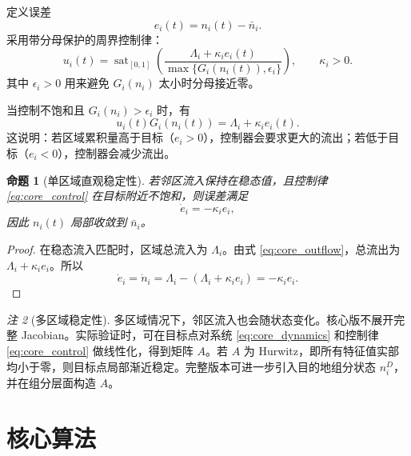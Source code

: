 \documentclass[a4paper,12pt]{article}
\theoremstyle{plain}
\newtheorem{proposition}{命题}[section]
\theoremstyle{definition}
\theoremstyle{remark}
\newtheorem{remark}[proposition]{注}
\begin{document}
定义误差
\begin{equation}\label{eq:core_error}
    e_i(t)=n_i(t)-\bar n_i .
\end{equation}
采用带分母保护的周界控制律：
\begin{equation}\label{eq:core_control}
    u_i(t)
    =
    \operatorname{sat}_{[0,1]}
    \left(
    \frac{\Lambda_i+\kappa_i e_i(t)}
    {\max\{G_i(n_i(t)),\epsilon_i\}}
    \right),
    \qquad
    \kappa_i>0 .
\end{equation}
其中 $\epsilon_i>0$ 用来避免 $G_i(n_i)$ 太小时分母接近零。

当控制不饱和且 $G_i(n_i)>\epsilon_i$ 时，有
\begin{equation}\label{eq:core_outflow}
    u_i(t)G_i(n_i(t))
    =
    \Lambda_i+\kappa_i e_i(t).
\end{equation}
这说明：若区域累积量高于目标（$e_i>0$），控制器会要求更大的流出；若低于目标（$e_i<0$），控制器会减少流出。

\begin{proposition}[单区域直观稳定性]\label{prop:core_single_stability}
若邻区流入保持在稳态值，且控制律 \eqref{eq:core_control} 在目标附近不饱和，则误差满足
\[
    \dot e_i=-\kappa_i e_i,
\]
因此 $n_i(t)$ 局部收敛到 $\bar n_i$。
\end{proposition}

\begin{proof}
在稳态流入匹配时，区域总流入为 $\Lambda_i$。由式 \eqref{eq:core_outflow}，总流出为 $\Lambda_i+\kappa_i e_i$。所以
\[
    \dot e_i
    =
    \dot n_i
    =
    \Lambda_i-(\Lambda_i+\kappa_i e_i)
    =
    -\kappa_i e_i .
\]
\end{proof}

\begin{remark}[多区域稳定性]
多区域情况下，邻区流入也会随状态变化。核心版不展开完整 Jacobian。实际验证时，可在目标点对系统 \eqref{eq:core_dynamics} 和控制律 \eqref{eq:core_control} 做线性化，得到矩阵 $A$。若 $A$ 为 Hurwitz，即所有特征值实部均小于零，则目标点局部渐近稳定。完整版本可进一步引入目的地组分状态 $n_i^D$，并在组分层面构造 $A$。
\end{remark}

\section{核心算法}
\end{document}
